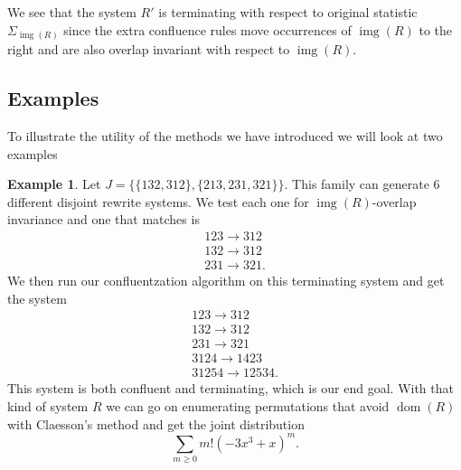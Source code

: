 \documentclass[a4paper, 11pt, english]{article}
\newcommand{\patternrule}{ \to \!}
\theoremstyle{definition}
\newtheorem{example}[theorem]{Example}
\DeclareMathOperator{\dom}{dom}
\DeclareMathOperator{\img}{img}
\begin{document}
We see that the system $R'$ is terminating with respect to original statistic $\Sigma_{\img(R)}$
since the extra confluence rules move occurrences of $\img(R)$ to the right and are also overlap
invariant with respect to $\img(R)$.

\subsection{Examples}
To illustrate the utility of the methods we have introduced we will look at two
examples

\begin{example}
Let $J=\{\{ 132, 312 \}, \{ 213, 231, 321 \}\}$. This family can generate 6
different disjoint rewrite systems. We test each one for $\img(R)$-overlap invariance 
and one that matches is 
\[
    \begin{matrix}
        123 \patternrule 312 \\
        132 \patternrule 312 \\
        231 \patternrule 321.
    \end{matrix}
\]
We then run our confluentzation algorithm on this terminating system
and get the system
\[
    \begin{matrix}
        123 \patternrule 312 \\
        132 \patternrule 312 \\
        231 \patternrule 321 \\
        3124 \patternrule 1423 \\
        31254 \patternrule 12534.
    \end{matrix}
\]
This system is both confluent and terminating, which is our end goal.
With that kind of system $R$ we can go on enumerating
permutations that avoid $\dom(R)$ with Claesson's method and get the joint distribution
\[
  \sum_{m \geq 0} m! (-3x^3 + x)^m.
\]
 
\end{example}
\end{document}
